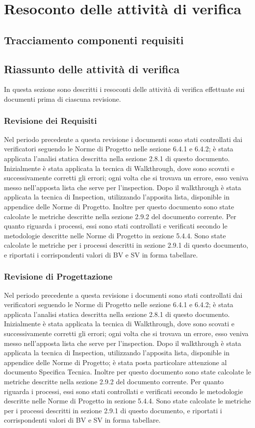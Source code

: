 \newpage
\section{Resoconto delle attività di verifica}
\subsection{Tracciamento componenti requisiti}
\subsection{Riassunto delle attività di verifica}
In questa sezione sono descritti i resoconti delle attività di verifica effettuate sui documenti prima di ciascuna revisione.
\subsubsection{Revisione dei Requisiti}
Nel periodo precedente a questa revisione i documenti sono stati controllati dai verificatori seguendo le Norme di Progetto nelle sezione 6.4.1 e 6.4.2; è stata applicata l'analisi statica descritta nella sezione 2.8.1 di questo documento.
Inizialmente è stata applicata la tecnica di Walkthrough, dove sono scovati e successivamente corretti gli errori; ogni volta che si trovava un errore, esso veniva messo nell'apposta lista che serve per l'inspection.
Dopo il walkthrough è stata applicata la tecnica di Inspection, utilizzando l'apposita lista, disponible in appendice delle Norme di Progetto. Inoltre per questo documento sono state calcolate le metriche descritte nella sezione 2.9.2 del documento corrente.
Per quanto riguarda i processi, essi sono stati controllati e verificati secondo le metodologie descritte nelle Norme di Progetto in sezione 5.4.4. Sono state calcolate le metriche per i processi descritti in sezione 2.9.1 di questo documento, e riportati i corrispondenti valori di BV e SV in forma tabellare.
\subsubsection{Revisione di Progettazione}
Nel periodo precedente a questa revisione i documenti sono stati controllati dai verificatori seguendo le Norme di Progetto nelle sezione 6.4.1 e 6.4.2; è stata applicata l'analisi statica descritta nella sezione 2.8.1 di questo documento.
Inizialmente è stata applicata la tecnica di Walkthrough, dove sono scovati e successivamente corretti gli errori; ogni volta che si trovava un errore, esso veniva messo nell'apposta lista che serve per l'inspection.
Dopo il walkthrough è stata applicata la tecnica di Inspection, utilizzando l'apposita lista, disponible in appendice delle Norme di Progetto; è stata posta particolare attenzione al documento Specifica Tecnica. Inoltre per questo documento sono state calcolate le metriche descritte nella sezione 2.9.2 del documento corrente.
Per quanto riguarda i processi, essi sono stati controllati e verificati secondo le metodologie descritte nelle Norme di Progetto in sezione 5.4.4. Sono state calcolate le metriche per i processi descritti in sezione 2.9.1 di questo documento, e riportati i corrispondenti valori di BV e SV in forma tabellare.
